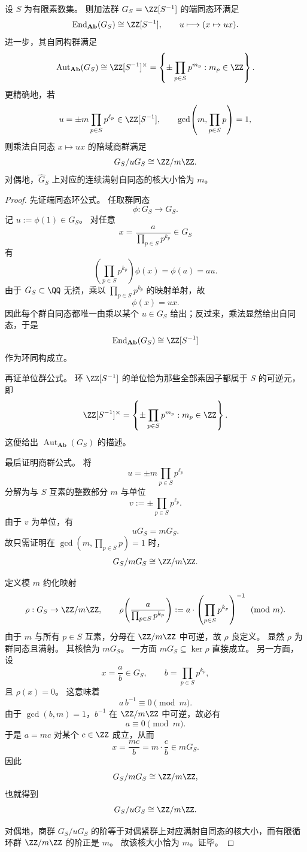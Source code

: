 \begin{theorem}[局部化数系的自同构群与有限核公式]\label{thm:conclusion-localized-groups-aut-and-finite-kernels}
设 \(S\) 为有限素数集。
则加法群 \(G_S=\ZZ[S^{-1}]\) 的端同态环满足
\[
\operatorname{End}_{\mathbf{Ab}}(G_S)\cong \ZZ[S^{-1}],
\qquad
u\longmapsto (x\mapsto ux).
\]
进一步，其自同构群满足
\[
\operatorname{Aut}_{\mathbf{Ab}}(G_S)
\cong
\ZZ[S^{-1}]^\times
=
\left\{
\pm \prod_{p\in S}p^{m_p}: m_p\in\ZZ
\right\}.
\]
更精确地，若
\[
u=\pm m\prod_{p\in S}p^{\ell_p}\in \ZZ[S^{-1}],
\qquad
\gcd\!\left(m,\prod_{p\in S}p\right)=1,
\]
则乘法自同态 \(x\mapsto ux\) 的陪域商群满足
\[
G_S/uG_S\cong \ZZ/m\ZZ.
\]
对偶地，\(\widehat G_S\) 上对应的连续满射自同态的核大小恰为 \(m\)。
\end{theorem}
\begin{proof}
先证端同态环公式。
任取群同态
\[
\phi:G_S\to G_S.
\]
记 \(u:=\phi(1)\in G_S\)。
对任意
\[
x=\frac{a}{\prod_{p\in S}p^{k_p}}\in G_S
\]
有
\[
\left(\prod_{p\in S}p^{k_p}\right)\phi(x)=\phi(a)=au.
\]
由于 \(G_S\subset \QQ\) 无挠，乘以 \(\prod_{p\in S}p^{k_p}\) 的映射单射，故
\[
\phi(x)=ux.
\]
因此每个群自同态都唯一由乘以某个 \(u\in G_S\) 给出；反过来，乘法显然给出自同态，于是
\[
\operatorname{End}_{\mathbf{Ab}}(G_S)\cong \ZZ[S^{-1}]
\]
作为环同构成立。

再证单位群公式。
环 \(\ZZ[S^{-1}]\) 的单位恰为那些全部素因子都属于 \(S\) 的可逆元，即
\[
\ZZ[S^{-1}]^\times
=
\left\{
\pm \prod_{p\in S}p^{m_p}: m_p\in\ZZ
\right\}.
\]
这便给出 \(\operatorname{Aut}_{\mathbf{Ab}}(G_S)\) 的描述。

最后证明商群公式。
将
\[
u=\pm m\prod_{p\in S}p^{\ell_p}
\]
分解为与 \(S\) 互素的整数部分 \(m\) 与单位
\[
v:=\pm \prod_{p\in S}p^{\ell_p}.
\]
由于 \(v\) 为单位，有
\[
uG_S=mG_S.
\]
故只需证明在 \(\gcd(m,\prod_{p\in S}p)=1\) 时，
\[
G_S/mG_S\cong \ZZ/m\ZZ.
\]

定义模 \(m\) 约化映射
\[
\rho:G_S\to \ZZ/m\ZZ,
\qquad
\rho\!\left(\frac{a}{\prod_{p\in S}p^{k_p}}\right)
:=
a\cdot
\left(\prod_{p\in S}p^{k_p}\right)^{-1}
\pmod m.
\]
由于 \(m\) 与所有 \(p\in S\) 互素，分母在 \(\ZZ/m\ZZ\) 中可逆，故 \(\rho\) 良定义。
显然 \(\rho\) 为群同态且满射。
其核恰为 \(mG_S\)。
一方面 \(mG_S\subseteq \ker\rho\) 直接成立。
另一方面，设
\[
x=\frac{a}{b}\in G_S,
\qquad
b=\prod_{p\in S}p^{k_p},
\]
且 \(\rho(x)=0\)。
这意味着
\[
a\,b^{-1}\equiv 0 \pmod m.
\]
由于 \(\gcd(b,m)=1\)，\(b^{-1}\) 在 \(\ZZ/m\ZZ\) 中可逆，故必有
\[
a\equiv 0\pmod m.
\]
于是 \(a=mc\) 对某个 \(c\in\ZZ\) 成立，从而
\[
x=\frac{mc}{b}=m\cdot \frac{c}{b}\in mG_S.
\]
因此
\[
G_S/mG_S\cong \ZZ/m\ZZ,
\]
也就得到
\[
G_S/uG_S\cong \ZZ/m\ZZ.
\]

对偶地，商群 \(G_S/uG_S\) 的阶等于对偶紧群上对应满射自同态的核大小，而有限循环群 \(\ZZ/m\ZZ\) 的阶正是 \(m\)。
故该核大小恰为 \(m\)。证毕。
\end{proof}

